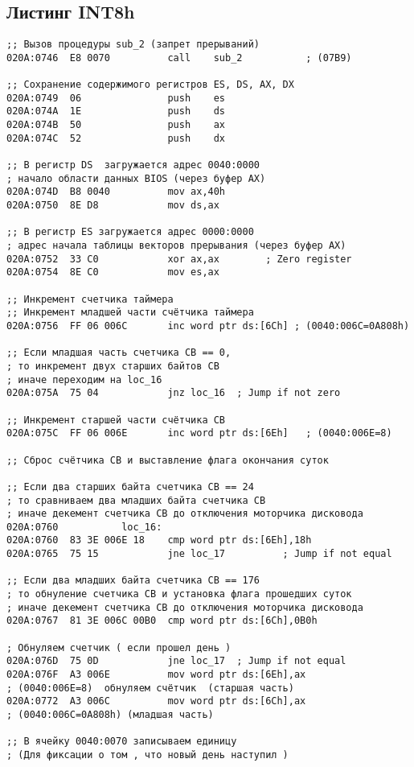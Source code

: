 \subsection*{Листинг INT8h} 
\begin{lstlisting}[style={asm}]
;; Вызов процедуры sub_2 (запрет прерываний)
020A:0746  E8 0070			call	sub_2			; (07B9)

;; Сохранение содержимого регистров ES, DS, AX, DX
020A:0749  06				push	es
020A:074A  1E				push	ds
020A:074B  50				push	ax
020A:074C  52				push	dx

;; В регистр DS  загружается адрес 0040:0000
; начало области данных BIOS (через буфер AX)
020A:074D  B8 0040			mov	ax,40h
020A:0750  8E D8			mov	ds,ax

;; В регистр ES загружается адрес 0000:0000 
; адрес начала таблицы векторов прерывания (через буфер AX)
020A:0752  33 C0			xor	ax,ax	     ; Zero register
020A:0754  8E C0			mov	es,ax

;; Инкремент счетчика таймера
;; Инкремент младшей части счётчика таймера
020A:0756  FF 06 006C		inc	word ptr ds:[6Ch] ; (0040:006C=0A808h)

;; Если младшая часть счетчика СВ == 0,
; то инкремент двух старших байтов СВ
; иначе переходим на loc_16  
020A:075A  75 04			jnz	loc_16	; Jump if not zero

;; Инкремент старшей части счётчика СВ
020A:075C  FF 06 006E		inc	word ptr ds:[6Eh]	; (0040:006E=8) 

;; Сброс счётчика СВ и выставление флага окончания суток

;; Если два старших байта счетчика СВ == 24
; то сравниваем два младших байта счетчика СВ
; иначе декемент счетчика СВ до отключения моторчика дисковода
020A:0760			loc_16:
020A:0760  83 3E 006E 18	cmp	word ptr ds:[6Eh],18h
020A:0765  75 15			jne	loc_17			; Jump if not equal

;; Если два младших байта счетчика СВ == 176
; то обнуление счетчика СВ и установка флага прошедших суток
; иначе декемент счетчика СВ до отключения моторчика дисковода
020A:0767  81 3E 006C 00B0	cmp	word ptr ds:[6Ch],0B0h	

; Обнуляем счетчик ( если прошел день )
020A:076D  75 0D			jne	loc_17	; Jump if not equal
020A:076F  A3 006E			mov	word ptr ds:[6Eh],ax	
; (0040:006E=8)  обнуляем счётчик  (старшая часть)
020A:0772  A3 006C			mov	word ptr ds:[6Ch],ax	
; (0040:006C=0A808h) (младшая часть)

;; В ячейку 0040:0070 записываем единицу 
; (Для фиксации о том , что новый день наступил )


\end{lstlisting}

